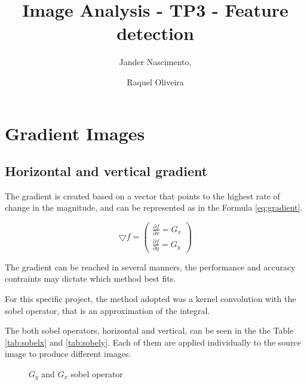 \documentclass{article}
\begin{document}
\title{Image Analysis - TP3 - Feature detection}

\author{Jander Nascimento, 
\and Raquel Oliveira}

\maketitle

\section{Gradient Images}
	
	\subsection{Horizontal and vertical gradient}

	The gradient is created based on a vector that points to the highest rate of change in the magnitude, and can be represented as in the Formula \ref{eq:gradient}. 

\begin{equation}
\bigtriangledown f = \begin{pmatrix}
\frac{\partial f}{\partial x} = G_x\\ 
\frac{\partial f}{\partial y} = G_y
\end{pmatrix}
\label{eq:gradient}
\end{equation}

The gradient can be reached in several manners, the performance and accuracy contraints may dictate which method best fits. 

For this specific project, the method adopted was a kernel convolution with the sobel operator, that is an approximation of the integral. 

The both sobel operators, horizontal and vertical, can be seen in the the Table \ref{tab:sobelx} and \ref{tab:sobely}. Each of them are applied individually to the source image to produce different images.

\begin{figure}
  \begin{center}
  \end{center}
  \caption{$G_y$ and $G_x$ sobel operator}
\end{figure}
\end{document}
